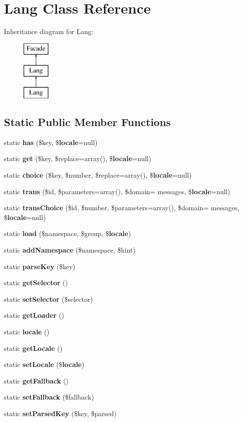 \section{Lang Class Reference}
\label{class_lang}
Inheritance diagram for Lang\+:\begin{figure}[H]
\begin{center}
\leavevmode
\includegraphics[height=3.000000cm]{class_lang}
\end{center}
\end{figure}
\subsection*{Static Public Member Functions}
\begin{DoxyCompactItemize}
\item 
static {\bf has} (\$key, \${\bf locale}=null)
\item 
static {\bf get} (\$key, \$replace=array(), \${\bf locale}=null)
\item 
static {\bf choice} (\$key, \$number, \$replace=array(), \${\bf locale}=null)
\item 
static {\bf trans} (\$id, \$parameters=array(), \$domain= \textquotesingle{}messages\textquotesingle{}, \${\bf locale}=null)
\item 
static {\bf trans\+Choice} (\$id, \$number, \$parameters=array(), \$domain= \textquotesingle{}messages\textquotesingle{}, \${\bf locale}=null)
\item 
static {\bf load} (\$namespace, \$group, \${\bf locale})
\item 
static {\bf add\+Namespace} (\$namespace, \$hint)
\item 
static {\bf parse\+Key} (\$key)
\item 
static {\bf get\+Selector} ()
\item 
static {\bf set\+Selector} (\$selector)
\item 
static {\bf get\+Loader} ()
\item 
static {\bf locale} ()
\item 
static {\bf get\+Locale} ()
\item 
static {\bf set\+Locale} (\${\bf locale})
\item 
static {\bf get\+Fallback} ()
\item 
static {\bf set\+Fallback} (\$fallback)
\item 
static {\bf set\+Parsed\+Key} (\$key, \$parsed)
\end{DoxyCompactItemize}
